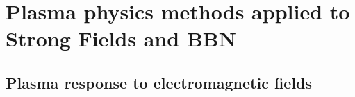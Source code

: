 



\section{Plasma physics methods applied to Strong Fields and BBN}\label{part4}
\subsection{Plasma response to electromagnetic fields}
\label{chap:PlasmaSF}




